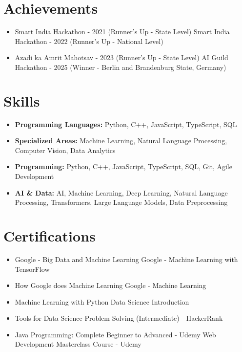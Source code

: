 \documentclass[a4paper,10pt]{article}
\begin{document}
\section*{Achievements}
\begin{itemize}
\item Smart India Hackathon - 2021 (Runner's Up - State Level) \hfill Smart India Hackathon - 2022 (Runner's Up - National Level)
\item Azadi ka Amrit Mahotsav - 2023 (Runner's Up - State Level) \hfill AI Guild Hackathon - 2025 (Winner - Berlin and Brandenburg State, Germany)
\end{itemize}

\section*{Skills}
\begin{itemize}
  \item \textbf{Programming Languages:} Python, C++, JavaScript, TypeScript, SQL
  \item \textbf{Specialized Areas:} Machine Learning, Natural Language Processing, Computer Vision, Data Analytics
  \item \textbf{Programming:} Python, C++, JavaScript, TypeScript, SQL, Git, Agile Development
  \item \textbf{AI \& Data:} AI, Machine Learning, Deep Learning, Natural Language Processing, Transformers, Large Language Models, Data Preprocessing
\end{itemize}

\section*{Certifications}
\begin{itemize}
\item Google - Big Data and Machine Learning \hfill Google - Machine Learning with TensorFlow
\item How Google does Machine Learning \hfill Google - Machine Learning
\item Machine Learning with Python \hfill Data Science Introduction
\item Tools for Data Science \hfill Problem Solving (Intermediate) - HackerRank
\item Java Programming: Complete Beginner to Advanced - Udemy \hfill Web Development Masterclass Course - Udemy
\end{itemize}
\end{document}
